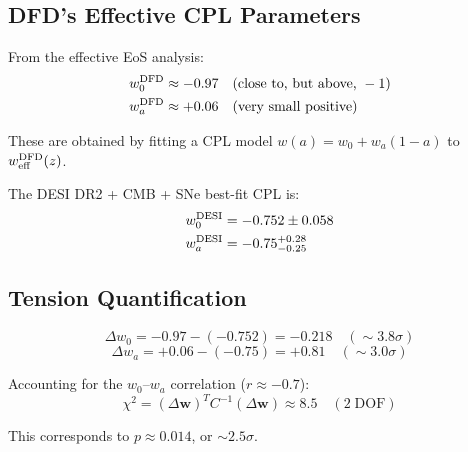 \documentclass[11pt,a4paper]{article}
\begin{document}
\subsection{DFD's Effective CPL Parameters}

From the effective EoS analysis:
\begin{align}
w_0^{\rm DFD} &\approx -0.97 \quad (\text{close to, but above, } -1) \\
w_a^{\rm DFD} &\approx +0.06 \quad (\text{very small positive})
\end{align}

These are obtained by fitting a CPL model $w(a) = w_0 + w_a(1-a)$
to $w_{\rm eff}^{\rm DFD}(z)$.

The DESI DR2 + CMB + SNe best-fit CPL is:
\begin{align}
w_0^{\rm DESI} &= -0.752 \pm 0.058 \\
w_a^{\rm DESI} &= -0.75^{+0.28}_{-0.25}
\end{align}

\subsection{Tension Quantification}

\begin{equation}
\Delta w_0 = -0.97 - (-0.752) = -0.218 \quad (\sim 3.8\sigma)
\end{equation}
\begin{equation}
\Delta w_a = +0.06 - (-0.75) = +0.81 \quad (\sim 3.0\sigma)
\end{equation}

Accounting for the $w_0$--$w_a$ correlation ($r \approx -0.7$):
\begin{equation}
\chi^2 = (\Delta\mathbf{w})^T C^{-1} (\Delta\mathbf{w}) \approx 8.5
\quad (2\;\text{DOF})
\end{equation}

This corresponds to $p \approx 0.014$, or $\sim 2.5\sigma$.
\end{document}
